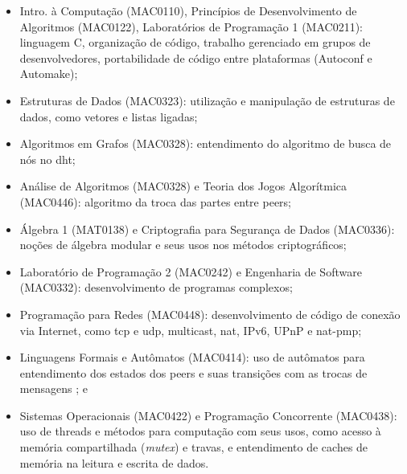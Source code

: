 \begin{itemize}
    \item Intro. à Computação (MAC0110), Princípios de Desenvolvimento de Algoritmos
        (MAC0122), Laboratórios de Programação 1 (MAC0211): linguagem C, organização de
        código, trabalho gerenciado em grupos de desenvolvedores, portabilidade de
        código entre plataformas (Autoconf e Automake);

    \item Estruturas de Dados (MAC0323): utilização e manipulação de estruturas de
        dados, como vetores e listas ligadas;

    \item Algoritmos em Grafos (MAC0328): entendimento do algoritmo de busca de nós no
        \gls{dht};

    \item Análise de Algoritmos (MAC0328) e Teoria dos Jogos Algorítmica (MAC0446):
        algoritmo da troca das partes entre \glspl{peer};

    \item Álgebra 1 (MAT0138) e Criptografia para Segurança de Dados (MAC0336): noções
        de álgebra modular e seus usos nos métodos criptográficos;

    \item Laboratório de Programação 2 (MAC0242) e Engenharia de Software (MAC0332):
        desenvolvimento de programas complexos;

    \item Programação para Redes (MAC0448): desenvolvimento de código de conexão via
        Internet, como \gls{tcp} e \gls{udp}, multicast, \gls{nat}, IPv6, UPnP e
        \gls*{nat}-pmp;

    \item Linguagens Formais e Autômatos (MAC0414): uso de autômatos para entendimento
        dos estados dos \glspl*{peer} e suas transições com as trocas de mensagens
        \cite{conf:swarming}; e

    \item Sistemas Operacionais (MAC0422) e Programação Concorrente (MAC0438): uso de
        \glspl{thread} e métodos para computação com seus usos, como acesso à memória
        compartilhada (\emph{mutex}) e travas, e entendimento de caches de memória na
        leitura e escrita de dados.
\end{itemize}

\afterpage{\clearpage}